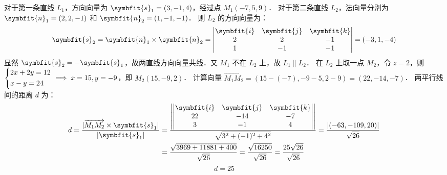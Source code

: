 \begin{solution}
    对于第一条直线 $L_1$，方向向量为 $\symbfit{s}_1 = (3, -1, 4)$，经过点 $M_1(-7, 5, 9)$．
    对于第二条直线 $L_2$，法向量分别为 $\symbfit{n}_1 = (2, 2, -1)$ 和 $\symbfit{n}_2 = (1, -1, -1)$．
    则 $L_2$ 的方向向量为：
    \begin{equation}
        \symbfit{s}_2 = \symbfit{n}_1 \times \symbfit{n}_2 = \begin{vmatrix} \symbfit{i} & \symbfit{j} & \symbfit{k} \\ 2 & 2 & -1 \\ 1 & -1 & -1 \end{vmatrix} = (-3, 1, -4)
    \end{equation}
    显然 $\symbfit{s}_2 = - \symbfit{s}_1$，故两直线方向向量共线．又 $M_1$ 不在 $L_2$ 上，故 $L_1 \parallel L_2$．
    在 $L_2$ 上取一点 $M_2$，令 $z=2$，则 $\begin{dcases} 2x+2y=12 \\ x-y=24 \end{dcases} \implies x=15, y=-9$，即 $M_2(15, -9, 2)$．
    计算向量 $\overrightarrow{M_1 M_2} = (15 - (-7), -9 - 5, 2 - 9) = (22, -14, -7)$．
    两平行线间的距离 $d$ 为：
    \begin{equation}
        \begin{aligned}
            d = \frac{|\overrightarrow{M_1 M_2} \times \symbfit{s}_1|}{|\symbfit{s}_1|} & = \frac{\left| \begin{vmatrix} \symbfit{i} & \symbfit{j} & \symbfit{k} \\ 22 & -14 & -7 \\ 3 & -1 & 4 \end{vmatrix} \right|}{\sqrt{3^2 + (-1)^2 + 4^2}} = \frac{|(-63, -109, 20)|}{\sqrt{26}} \\
                                                                                        & = \frac{\sqrt{3969 + 11881 + 400}}{\sqrt{26}} = \frac{\sqrt{16250}}{\sqrt{26}} = \frac{25\sqrt{26}}{\sqrt{26}}
        \end{aligned}
    \end{equation}
    \begin{equation}
        \boxed{d = 25}
    \end{equation}
\end{solution}


